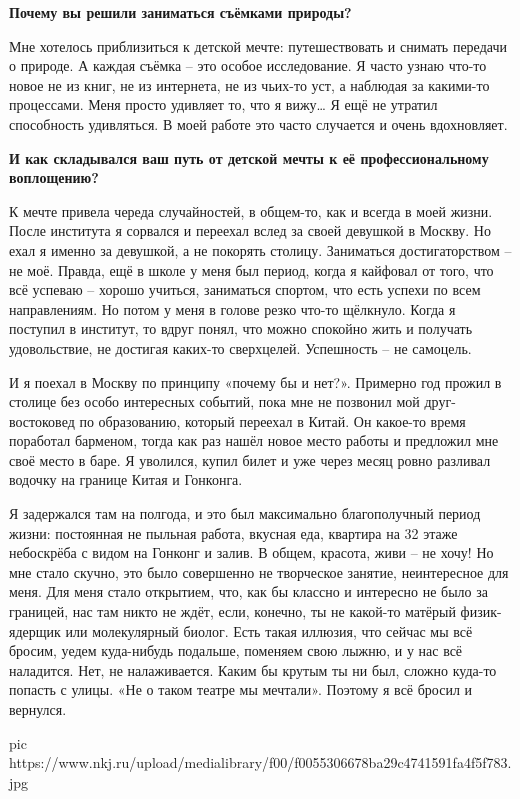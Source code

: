 \textbf{Почему вы решили заниматься съёмками природы?}

Мне хотелось приблизиться к детской мечте: путешествовать и снимать передачи о
природе. А каждая съёмка – это особое исследование. Я часто узнаю что-то новое
не из книг, не из интернета, не из чьих-то уст, а наблюдая за какими-то
процессами. Меня просто удивляет то, что я вижу… Я ещё не утратил способность
удивляться. В моей работе это часто случается и очень вдохновляет. 

\textbf{И как складывался ваш путь от детской мечты к её профессиональному воплощению?}

К мечте привела череда случайностей, в общем-то, как и всегда в моей жизни.
После института я сорвался и переехал вслед за своей девушкой в Москву. Но ехал
я именно за девушкой, а не покорять столицу. Заниматься достигаторством – не
моё. Правда, ещё в школе у меня был период, когда я кайфовал от того, что всё
успеваю – хорошо учиться, заниматься спортом, что есть успехи по всем
направлениям. Но потом у меня в голове резко что-то щёлкнуло. Когда я поступил
в институт, то вдруг понял, что можно спокойно жить и получать удовольствие, не
достигая каких-то сверхцелей. Успешность – не самоцель. 

И я поехал в Москву по принципу «почему бы и нет?». Примерно год прожил в
столице без особо интересных событий, пока мне не позвонил мой друг-востоковед
по образованию, который переехал в Китай. Он какое-то время поработал
барменом, тогда как раз нашёл новое место работы и предложил мне своё место в
баре. Я уволился, купил билет и уже через месяц ровно разливал водочку на
границе Китая и Гонконга.

Я задержался там на полгода, и это был максимально благополучный период жизни:
постоянная не пыльная работа, вкусная еда, квартира на 32 этаже небоскрёба с
видом на Гонконг и залив. В общем, красота, живи – не хочу! Но мне стало
скучно, это было совершенно не творческое занятие, неинтересное для меня. Для
меня стало открытием, что, как бы классно и интересно не было за границей, нас
там никто не ждёт, если, конечно, ты не какой-то матёрый физик-ядерщик или
молекулярный биолог. Есть такая иллюзия, что сейчас мы всё бросим, уедем
куда-нибудь подальше, поменяем свою лыжню, и у нас всё наладится. Нет, не
налаживается. Каким бы крутым ты ни был, сложно куда-то попасть с улицы. «Не о
таком театре мы мечтали». Поэтому я всё бросил и вернулся. 

\ifcmt
pic https://www.nkj.ru/upload/medialibrary/f00/f0055306678ba29c4741591fa4f5f783.jpg
\fi

